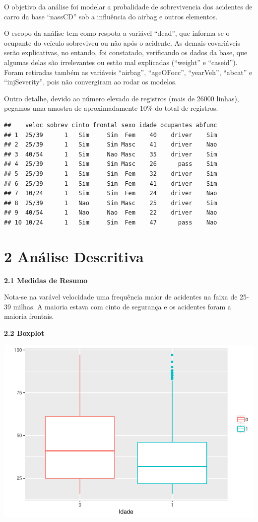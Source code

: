 \documentclass[]{article}
\begin{document}
O objetivo da análise foi modelar a probalidade de sobrevivencia dos
acidentes de carro da base ``nassCD'' sob a influência do airbag e
outros elementos.

O escopo da análise tem como respota a variável ``dead'', que informa se
o ocupante do veículo sobreviveu ou não após o acidente. As demais
covariáveis serão explicativas, no entando, foi constatado, verificando
os dados da base, que algumas delas são irrelevantes ou estão mal
explicadas (``weight'' e ``caseid''). Foram retiradas também as
variáveis ``airbag'', ``ageOFocc'', ``yearVeh'', ``abcat'' e
``injSeverity'', pois não convergiram ao rodar os modelos.

Outro detalhe, devido ao número elevado de registros (mais de 26000
linhas), pegamos uma amostra de aproximadamente 10\% do total de
registros.

\begin{verbatim}
##    veloc sobrev cinto frontal sexo idade ocupantes abfunc
## 1  25/39      1   Sim     Sim  Fem    40    driver    Sim
## 2  25/39      1   Sim     Sim Masc    41    driver    Nao
## 3  40/54      1   Sim     Nao Masc    35    driver    Sim
## 4  25/39      1   Sim     Sim Masc    26      pass    Sim
## 5  25/39      1   Sim     Sim  Fem    32    driver    Sim
## 6  25/39      1   Sim     Sim  Fem    41    driver    Sim
## 7  10/24      1   Sim     Sim  Fem    24    driver    Nao
## 8  25/39      1   Nao     Sim Masc    25    driver    Sim
## 9  40/54      1   Nao     Nao  Fem    22    driver    Nao
## 10 10/24      1   Sim     Sim  Fem    47      pass    Nao
\end{verbatim}

\hypertarget{analise-descritiva}{%
\section{2 Análise Descritiva}\label{analise-descritiva}}

\textbf{2.1 Medidas de Resumo}

Nota-se na varável velocidade uma frequência maior de acidentes na faixa
de 25-39 milhas. A maioria estava com cinto de segurança e os acidentes
foram a maioria frontais.

\textbf{2.2 Boxplot}

\includegraphics{Binarios_files/figure-latex/unnamed-chunk-7-1.pdf}
\end{document}

